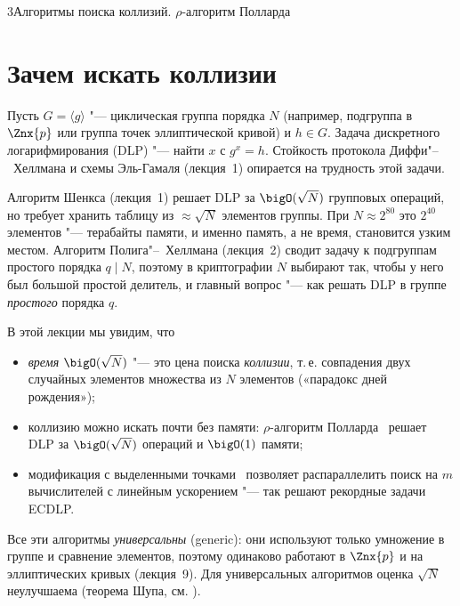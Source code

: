 \begin{lecture}{3}{Алгоритмы поиска коллизий. \texorpdfstring{$\rho$}{ρ}-алгоритм Полларда}

\section{Зачем искать коллизии}

Пусть $G = \langle g \rangle$ "--- циклическая группа порядка $N$ (например, подгруппа
в $\Znx{p}$ или группа точек эллиптической кривой) и $h \in G$. Задача дискретного
логарифмирования (DLP) "--- найти $x$ с $g^x = h$. Стойкость протокола Диффи"--~Хеллмана
и схемы Эль-Гамаля (лекция~1) опирается на трудность этой задачи.

Алгоритм Шенкса (лекция~1) решает DLP за $\bigO(\sqrt N)$ групповых операций, но требует
хранить таблицу из $\approx \sqrt N$ элементов группы. При $N \approx 2^{80}$ это $2^{40}$
элементов "--- терабайты памяти, и именно память, а не время, становится узким местом.
Алгоритм Полига"--~Хеллмана (лекция~2) сводит задачу к подгруппам простого порядка $q \mid N$,
поэтому в криптографии $N$ выбирают так, чтобы у него был большой простой делитель, и
главный вопрос "--- как решать DLP в группе \emph{простого} порядка $q$.

В этой лекции мы увидим, что
\begin{itemize}
  \item \emph{время} $\bigO(\sqrt N)$ "--- это цена поиска \emph{коллизии}, т.\,е. совпадения
    двух случайных элементов множества из $N$ элементов («парадокс дней рождения»);
  \item коллизию можно искать почти без памяти: $\rho$-алгоритм Полларда~\cite{pollard-rho-dlp}
    решает DLP за $\bigO(\sqrt N)$ операций и $\bigO(1)$ памяти;
  \item модификация с выделенными точками~\cite{van-oorschot-wiener} позволяет распараллелить
    поиск на $m$ вычислителей с линейным ускорением "--- так решают рекордные задачи ECDLP.
\end{itemize}
Все эти алгоритмы \emph{универсальны} (generic): они используют только умножение в группе
и сравнение элементов, поэтому одинаково работают в $\Znx{p}$ и на эллиптических кривых
(лекция~9). Для универсальных алгоритмов оценка $\sqrt N$ неулучшаема (теорема Шупа, см.
\cite[гл.~13]{galbraith}).


\end{lecture}
